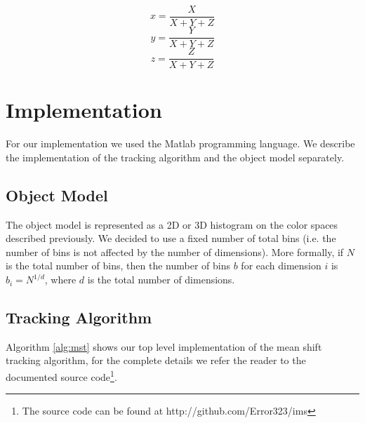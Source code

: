 \documentclass[11pt]{article}
\begin{document}
\begin{equation}
  x = \frac{X}{X+Y+Z}
  \label{eq:x}
\end{equation}
\begin{equation}
  y = \frac{Y}{X+Y+Z}
  \label{eq:y}
\end{equation}
\begin{equation}
  z = \frac{Z}{X+Y+Z}
  \label{eq:z}
\end{equation}


\section{Implementation} \label{sec:implementation}
For our implementation we used the Matlab programming language. We describe the
implementation of the tracking algorithm and the object model separately.

\subsection{Object Model} \label{sec:model}
The object model is represented as a 2D or 3D histogram on the color spaces
described previously. We decided to use a fixed number of total bins (i.e. the
number of bins is not affected by the number of dimensions).  More formally, if
$N$ is the total number of bins, then the number of bins $b$ for each dimension
$i$ is $b_i = N^{1/d}$, where $d$ is the total number of dimensions. 

\subsection{Tracking Algorithm} \label{sec:mst}
Algorithm \ref{alg:mst} shows our top level implementation of the mean shift
tracking algorithm, for the complete details we refer the reader to the
documented source code\footnote{The source code can be found at
http://github.com/Error323/ims}.
\end{document}
